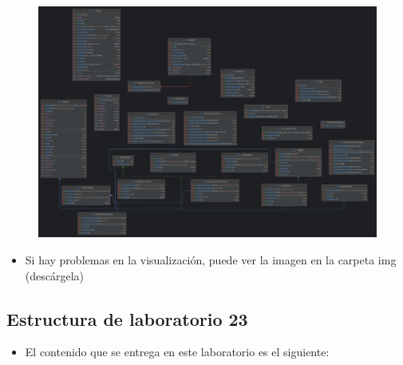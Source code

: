 \documentclass{article}
\begin{document}
	\begin{figure}[H]
		\centering
		\includegraphics[width=1\textwidth,keepaspectratio]{img/uml.png}
	\end{figure}
	
	\begin{itemize}	
			\item Si hay problemas en la visualización, puede ver la imagen en la carpeta img (descárgela)
	\end{itemize}
	
	
	
	
	
	\subsection{Estructura de laboratorio 23}
	\begin{itemize}	
		\item El contenido que se entrega en este laboratorio es el siguiente:
	\end{itemize}
	
\end{document}
